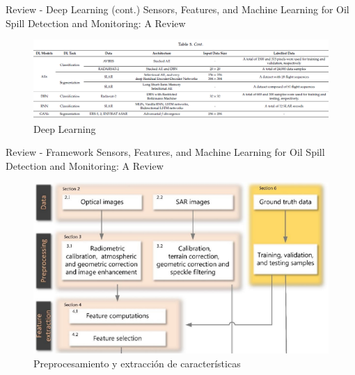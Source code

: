 \begin{frame}{Review - Deep Learning (cont.)}
    Sensors, Features, and Machine Learning for Oil Spill Detection and Monitoring: A Review \cite{rs12203338}
    \begin{figure}
        \centering
        \includegraphics[scale=0.5]{img/section_02/oil_spill_detection_deep_learning2.png}
        \caption{Deep Learning \cite{rs12203338}}
        \label{fig:my_label}
    \end{figure}
\end{frame}

\begin{frame}{Review - Framework}
    Sensors, Features, and Machine Learning for Oil Spill Detection and Monitoring: A Review \cite{rs12203338}
    \begin{figure}
        \centering
        \includegraphics[scale=0.6]{img/section_02/framework_spill_detection.png}
        \caption{Preprocesamiento y extracción de características \cite{rs12203338}}
        \label{fig:preprocessing_and_feature_extraction}
    \end{figure}
\end{frame}

